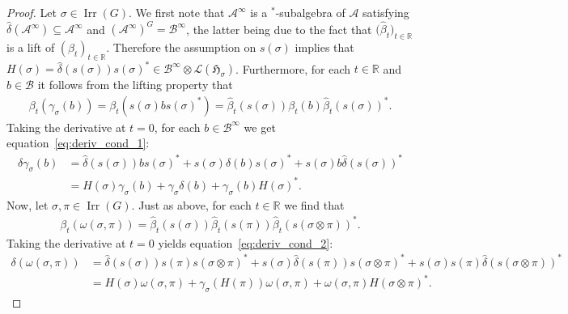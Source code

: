 \documentclass[10pt,a4paper]{amsart}
\numberwithin{equation}{section}
\newcommand*{\R}{\mathbb R}		%
\newcommand*{\tensor}{\otimes}		%
\newcommand*{\Star}{$^*$\nobreakdash}
\newcommand*{\hilb}{\mathfrak}		%
\newcommand*{\alg}{\mathcal}		%
\newcommand*{\hH}{\hilb{H}}			%
\newcommand*{\aA}{\alg{A}}			%
\newcommand*{\aB}{\alg{B}} 			%
\newcommand*{\End}{\mathcal{L}} %
\DeclareMathOperator{\Irrep}{Irr} 			%
\begin{document}
\begin{proof}
	Let $\sigma \in \Irrep(G)$.
	We first note that $\aA^\infty$ is a \Star-subalgebra of $\aA$ satisfying $\hat \delta(\aA^\infty) \subseteq \aA^\infty$ and $(\aA^\infty)^G = \aB^\infty$, the latter being due to the fact that $\big(\hat \beta_t\big)_{t \in \R}$ is a lift of $(\beta_t)_{t \in \R}$.
	Therefore the assumption on $s(\sigma)$ implies that $H(\sigma) = \hat \delta ( s(\sigma) ) s(\sigma)^* \in \aB^\infty \tensor \End(\hH_\sigma)$.
	Furthermore, for each $t \in \R$ and $b \in \aB$ it follows from the lifting property that
	\begin{gather*}
		\beta_t ( \gamma_\sigma(b) )
		= \beta_t ( s(\sigma) b s(\sigma)^* )
		= \hat\beta_t ( s(\sigma) ) \beta_t(b) \hat\beta_t ( s(\sigma) )^*.
	\end{gather*}
	Taking the derivative at $t=0$, for each $b \in \aB^\infty$ we get equation~\eqref{eq:deriv_cond_1}:
	\begin{align*}
		\delta \gamma_\sigma(b)
		&=
		\hat \delta ( s(\sigma) ) b s(\sigma)^* + s(\sigma) \delta(b) s(\sigma)^* + s(\sigma) b \hat \delta ( s(\sigma) )^*
		\\
		&= H(\sigma) \gamma_\sigma(b) + \gamma_\sigma \delta(b) + \gamma_\sigma(b) H(\sigma)^*.
	\end{align*}
	Now, let $\sigma, \pi \in \Irrep(G)$.
	Just as above, for each $t \in \R$ we find that
	\begin{gather*}
		\beta_t ( \omega(\sigma, \pi) )
		= \hat \beta_t ( s(\sigma) ) \hat\beta_t ( s(\pi) ) \hat\beta_t ( s(\sigma \tensor \pi) )^*.
	\end{gather*}
	Taking the derivative at $t=0$ yields equation~\eqref{eq:deriv_cond_2}:
	\begin{align*}
		\delta ( \omega(\sigma, \pi) )
		&=
		\hat \delta ( s(\sigma) ) s(\pi) s(\sigma \tensor \pi)^*
		+ s(\sigma) \hat \delta ( s(\pi) ) s(\sigma \tensor \pi)^*
		+ s(\sigma) s(\pi) \hat \delta ( s(\sigma \tensor \pi) )^*
		\\
		&=
		H(\sigma) \omega(\sigma, \pi)
		+ \gamma_\sigma ( H(\pi) ) \omega(\sigma, \pi)
		+ \omega(\sigma, \pi) H(\sigma \tensor \pi)^*.
		\tag*{\qed}	
	\end{align*}
	\renewcommand{\qed}{}
\end{proof}
\end{document}
